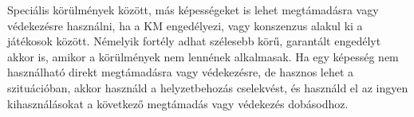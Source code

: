 Speciális körülmények között, más képességeket is lehet megtámadásra vagy védekezésre használni, ha a KM engedélyezi, vagy konszenzus alakul ki a játékosok között. Némelyik fortély adhat szélesebb körű, garantált engedélyt akkor is, amikor a körülmények nem lennének alkalmasak. Ha egy képesség nem használható direkt megtámadásra vagy védekezésre, de hasznos lehet a szituációban, akkor használd a helyzetbehozás cselekvést, és használd el az ingyen kihasználásokat a következő megtámadás vagy védekezés dobásodhoz.
